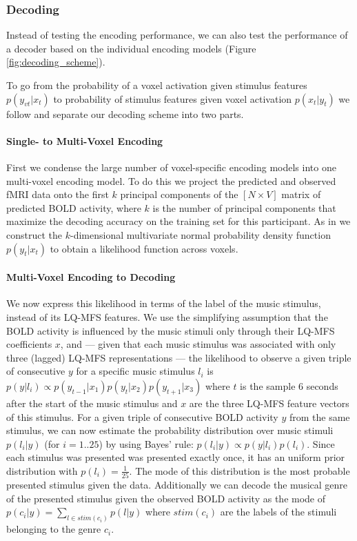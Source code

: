 \subsubsection*{Decoding}

Instead of testing the encoding performance, we can also test the performance
of a decoder based on the individual encoding models \citep{NG11} (Figure
\ref{fig:decoding_scheme}).

To go from the probability of a voxel activation
given stimulus features $p(y_{vt}|x_{t})$ to probability of stimulus features
given voxel activation $p(x_{t}|y_{t})$ we follow \citet{NG09} and separate our
decoding scheme into two parts. 

\paragraph{Single- to Multi-Voxel Encoding}

First we condense the large number of voxel-specific encoding models into one
multi-voxel encoding model.  To do this we project the predicted and observed
f{MRI} data onto the first $k$ principal components of the $[N\times V]$ matrix
of predicted BOLD activity, where $k$ is the number of principal components
that maximize the decoding accuracy on the training set for this participant.
As in \citet{NG09} we construct the $k$-dimensional multivariate normal
probability density function $p(y_{t}|x_{t})$ to obtain a likelihood function
across voxels. 


\paragraph{Multi-Voxel Encoding to Decoding}

We now express this likelihood in terms of the label of the music stimulus, instead of its LQ-MFS features.  We
use the simplifying assumption that the BOLD activity is influenced by the
music stimuli only through their LQ-MFS coefficients $x$, and --- given that
each music stimulus was associated with only three (lagged) LQ-MFS
representations --- the likelihood to observe a given triple of consecutive $y$
for a specific music stimulus $l_{i}$ is $p(y|l_{i}) \propto
p(y_{t-1}|x_{1})p(y_{t}|x_{2})p(y_{t+1}|x_{3})$ where $t$ is the sample 6
seconds after the start of the music stimulus and $x$ are the three LQ-MFS
feature vectors of this stimulus.  For a given triple of consecutive BOLD
activity $y$ from the same stimulus, we can now estimate the probability
distribution over music stimuli $p(l_{i}|y)$ (for $i=1..25$) by using Bayes'
rule: $p(l_{i}|y) \propto p(y|l_{i})p(l_{i})$.
Since each stimulus was presented was presented exactly once,
it has an uniform prior distribution with $p(l_{i})=\frac{1}{25}$. The mode of
this distribution is the most probable presented stimulus given the data. 
Additionally we can decode the musical genre of the presented stimulus given the observed
BOLD activity as the mode of $p(c_{i}|y) = \sum\nolimits_{l \in
  stim(c_{i})} p(l|y)$ where $stim(c_{i})$ are the labels of the stimuli
  belonging to the genre $c_{i}$. 


